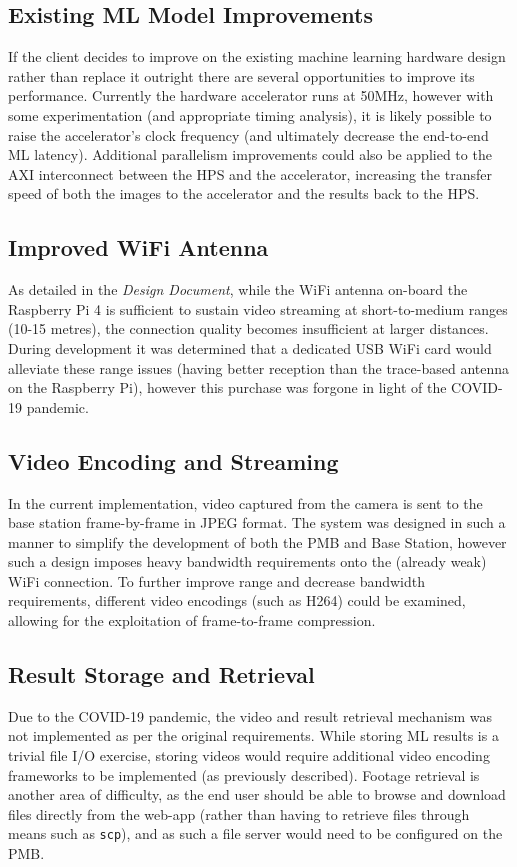 \documentclass[10pt,letterpaper]{article}
\begin{document}
\subsection{Existing ML Model Improvements}
If the client decides to improve on the existing machine learning hardware design rather than replace it outright there are several opportunities to improve its performance. Currently the hardware accelerator runs at 50MHz, however with some experimentation (and appropriate timing analysis), it is likely possible to raise the accelerator's clock frequency (and ultimately decrease the end-to-end ML latency). Additional parallelism improvements could also be applied to the AXI interconnect between the HPS and the accelerator, increasing the transfer speed of both the images to the accelerator and the results back to the HPS.

\subsection{Improved WiFi Antenna}
As detailed in the \textit{Design Document}, while the WiFi antenna on-board the Raspberry Pi 4 is sufficient to sustain video streaming at short-to-medium ranges (10-15 metres), the connection quality becomes insufficient at larger distances. During development it was determined that a dedicated USB WiFi card would alleviate these range issues (having better reception than the trace-based antenna on the Raspberry Pi), however this purchase was forgone in light of the COVID-19 pandemic. 

\subsection{Video Encoding and Streaming}
In the current implementation, video captured from the camera is sent to the base station frame-by-frame in JPEG format. The system was designed in such a manner to simplify the development of both the PMB and Base Station, however such a design imposes heavy bandwidth requirements onto the (already weak) WiFi connection. To further improve range and decrease bandwidth requirements, different video encodings (such as H264) could be examined, allowing for the exploitation of frame-to-frame compression.

\subsection{Result Storage and Retrieval}
Due to the COVID-19 pandemic, the video and result retrieval mechanism was not implemented as per the original requirements. While storing ML results is a trivial file I/O exercise, storing videos would require additional video encoding frameworks to be implemented (as previously described). Footage retrieval is another area of difficulty, as the end user should be able to browse and download files directly from the web-app (rather than having to retrieve files through means such as \texttt{scp}), and as such a file server would need to be configured on the PMB.  

\clearpage
{}



\end{document}
